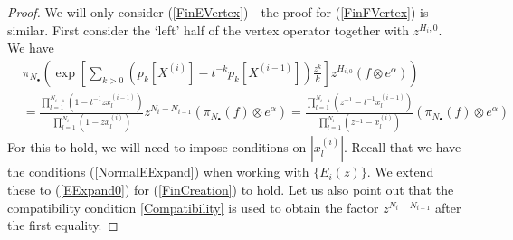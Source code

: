 \documentclass[10pt,a4paper]{amsart}
\begin{document}
\begin{proof}
We will only consider (\ref{FinEVertex})---the proof for (\ref{FinFVertex}) is similar.
First consider the `left' half of the vertex operator together with $z^{H_i,0}$. 
We have
\begin{align}
\nonumber
&\pi_{N_\bullet} \left(\exp\left[ \sum_{k>0}\left( p_k[X^{(i)}]-t^{-k}p_k[X^{(i-1)}] \right) \frac{z^k}{k}\right]z^{H_{i,0}} (f\otimes e^\alpha)\right) \\
\label{FinCreation}
&=
\frac{\displaystyle\prod_{l=1}^{N_{i-1}}\left(1-t^{-1}zx_{l}^{(i-1)}\right)}{\displaystyle\prod_{l=1}^{N_i} \left(1-zx_{l}^{(i)}\right)}
z^{N_i-N_{i-1}}
\left( \pi_{N_\bullet}(f)\otimes e^\alpha\right)
=
\frac{\displaystyle\prod_{l=1}^{N_{i-1}}\left(z^{-1}-t^{-1}x_{l}^{(i-1)}\right)}{\displaystyle\prod_{l=1}^{N_i} \left(z^{-1}-x_{l}^{(i)}\right)}
\left( \pi_{N_\bullet}(f)\otimes e^\alpha\right)
\end{align}
For this to hold, we will need to impose conditions on $|x_{l}^{(i)}|$.
Recall that we have the conditions (\ref{NormalEExpand}) when working with $\{E_i(z)\}$.
We extend these to (\ref{EExpand0}) for (\ref{FinCreation}) to hold. 
Let us also point out that the compatibility condition \eqref{Compatibility} is used to obtain the factor $z^{N_i-N_{i-1}}$ after the first equality.


\end{proof}
\end{document}
